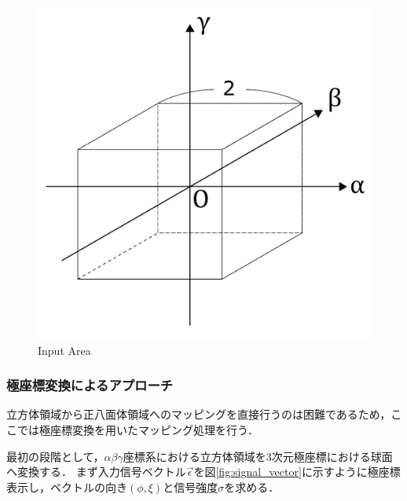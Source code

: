 \documentclass[../master]{subfiles}
\begin{document}
  \begin{figure}[h]
    \centering
    \includegraphics[width=80truemm, clip]{images/input.pdf}
    \caption{Input Area}
    \label{fig:input}
  \end{figure}

  \subsubsection{極座標変換によるアプローチ}

  立方体領域から正八面体領域へのマッピングを直接行うのは困難であるため，ここでは極座標変換を用いたマッピング処理を行う．

  最初の段階として，$\alpha\beta\gamma$座標系における立方体領域を3次元極座標における球面へ変換する．
  まず入力信号ベクトル$\vec{\epsilon}$を図\ref{fig:signal_vector}に示すように極座標表示し，ベクトルの向き$(\phi, \xi)$と信号強度$\sigma$を求める．
\end{document}
